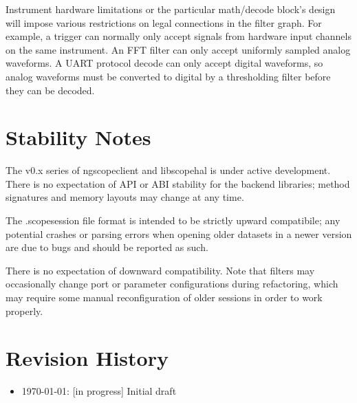 Instrument hardware limitations or the particular math/decode block's design will impose various restrictions on legal
connections in the filter graph. For example, a trigger can normally only accept signals from hardware input channels
on the same instrument. An FFT filter can only accept uniformly sampled analog waveforms. A UART protocol decode can
only accept digital waveforms, so analog waveforms must be converted to digital by a thresholding filter before they
can be decoded.

\section{Stability Notes}

The v0.x series of ngscopeclient and libscopehal is under active development. There is no expectation of API or ABI
stability for the backend libraries; method signatures and memory layouts may change at any time.

The .scopesession file format is intended to be strictly upward compatibile; any potential crashes or parsing errors
when opening older datasets in a newer version are due to bugs and should be reported as such.

There is no expectation of downward compatibility. Note that filters may occasionally change port or parameter
configurations during refactoring, which may require some manual reconfiguration of older sessions in order to work
properly.

\section{Revision History}
\begin{itemize}
\item \today: [in progress] Initial draft
\end{itemize}
